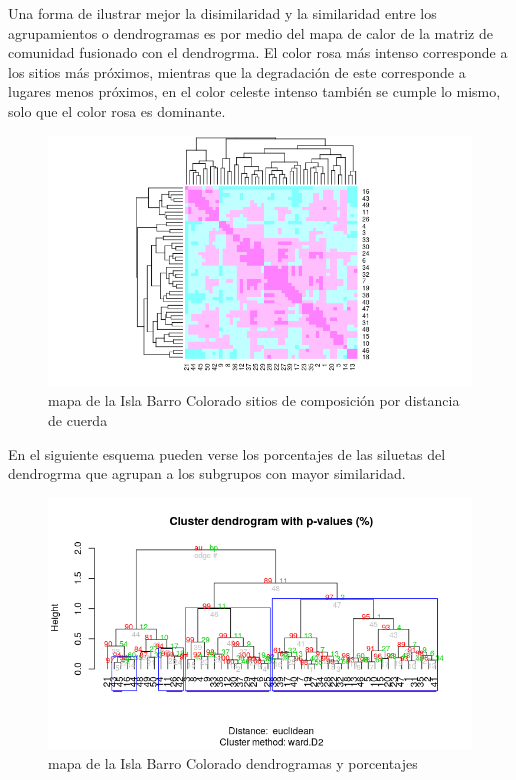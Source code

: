 \documentclass[11pt,]{article}
\begin{document}
Una forma de ilustrar mejor la disimilaridad y la similaridad entre los
agrupamientos o dendrogramas es por medio del mapa de calor de la matriz
de comunidad fusionado con el dendrogrma. El color rosa más intenso
corresponde a los sitios más próximos, mientras que la degradación de
este corresponde a lugares menos próximos, en el color celeste intenso
también se cumple lo mismo, solo que el color rosa es dominante.

\begin{figure}
\centering
\includegraphics[width=1.00000\textwidth]{comparacion_dendrograma_mapa_calor.png}
\caption{mapa de la Isla Barro Colorado sitios de composición por
distancia de cuerda \label{fig:bci_map}}
\end{figure}

En el siguiente esquema pueden verse los porcentajes de las siluetas del
dendrogrma que agrupan a los subgrupos con mayor similaridad.

\begin{figure}
\centering
\includegraphics[width=1.00000\textwidth]{agrupamiento_dendrogramas_porcentajes.png}
\caption{mapa de la Isla Barro Colorado dendrogramas y porcentajes
\label{fig:bci_map}}
\end{figure}
\end{document}
